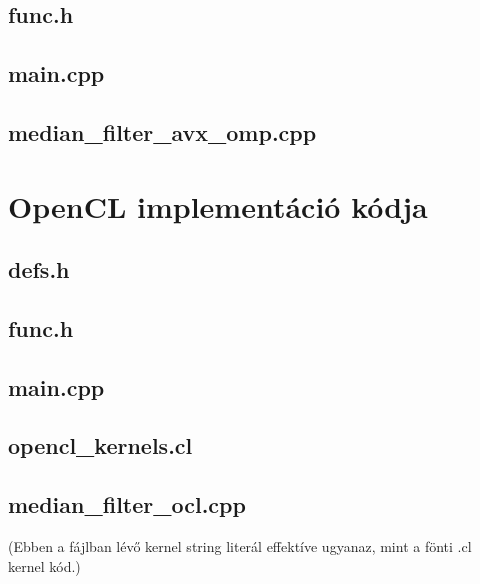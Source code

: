		\subsection{func.h}
			
		\subsection{main.cpp}
			
		\subsection{median\_filter\_avx\_omp.cpp}
			\label{appendix:avx2_omp}
			
	\clearpage
	\section{OpenCL implementáció kódja}
		\subsection{defs.h}
			
		\subsection{func.h}
			
		\subsection{main.cpp}
			
		\subsection{opencl\_kernels.cl}
			\label{appendix:ocl_kernel}
			
		\subsection{median\_filter\_ocl.cpp}
			(Ebben a fájlban lévő kernel string literál effektíve ugyanaz, mint a fönti .cl kernel kód.)
			
		


